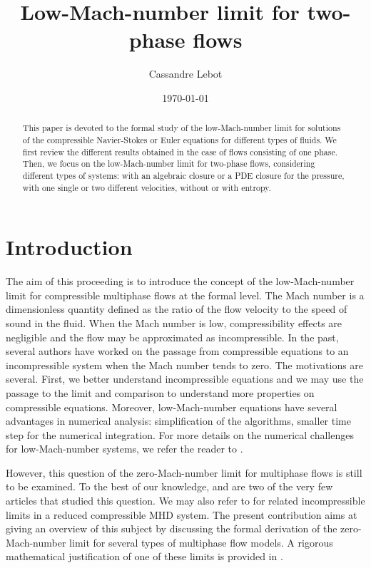 \documentclass[11pt, twoside, a4paper]{article}
\title{Low-Mach-number limit for two-phase flows}
\author{Cassandre Lebot}
\date{\today}
\theoremstyle{plain}
\theoremstyle{remark}
\numberwithin{equation}{section}
\begin{document}
\maketitle

\begin{abstract}
This paper is devoted to the formal study of the low-Mach-number limit for solutions of the compressible Navier-Stokes or Euler equations for different types of fluids. We first review the different results obtained in the case of flows consisting of one phase. Then, we focus on the low-Mach-number limit for two-phase flows, considering different types of systems: with an algebraic closure or a PDE closure for the pressure, with one single or two different velocities, without or with entropy.
\end{abstract}


\tableofcontents

\section{Introduction}

The aim of this proceeding is to introduce the concept of the low-Mach-number limit for compressible multiphase flows at the formal level. The Mach number is a dimensionless quantity defined as the ratio of the flow velocity to the speed of sound in the fluid. When the Mach number is low, compressibility effects are negligible and the flow may be approximated as incompressible. In the past, several authors have worked on the passage from compressible equations to an incompressible system when the Mach number tends to zero. The motivations are several. First, we better understand incompressible equations and we may use the passage to the limit and comparison to understand more properties on compressible equations. Moreover, low-Mach-number equations have several advantages in numerical analysis: simplification of the algorithms, smaller time step for the numerical integration. For more details on the numerical challenges for low-Mach-number systems, we refer the reader to \cite{battisti2025linearly}.

However, this question of the zero-Mach-number limit for multiphase flows is still to be examined. To the best of our knowledge, \cite{varsakelis2011low} and \cite{narbona2024two} are two of the very few articles that studied this question. We may also refer to \cite{fanelli2025incompressible} for related incompressible limits in a reduced compressible MHD system. The present contribution aims at giving an overview of this subject by discussing the formal derivation of the zero-Mach-number limit for several types of multiphase flow models. A rigorous mathematical justification of one of these limits is provided in \cite{lebot2026low}.
\end{document}
